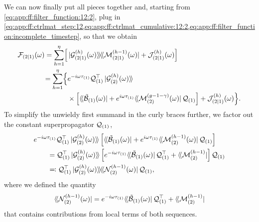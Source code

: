 We can now finally put all pieces together and, starting from \cref{eq:app:ff:filter_function:12:2}, plug in \cref{eq:app:ff:ctrlmat_step:12,eq:app:ff:ctrlmat_cumulative:12:2,eq:app:ff:filter_function:incomplete_timestep}, so that we obtain
\begin{align}
    \FF_{(2|1)}(\omega) = \sum_{h=1}^{\eta}\Bigl[ & \dop*{\mc{G}_{(2|1)}\gth{h}(\omega)}{\mc{M}_{(2|1)}\gth{h-1}(\omega)}
                                                    + \mc{J}_{(2|1)}\gth{h}(\omega)\Bigr] \notag \\
                        = \sum_{h=1}^{\eta}\Bigl\lbrace
                               & \e^{-\i\omega\tau_{(1)}}\liouvQ_{(1)}\transpose\dket*{\mc{G}_{(2)}\gth{h}(\omega)} \\
                               & \times\Bigl[
                                     \dbra*{\ctrlmat_{(1)}(\omega)} + \e^{\i\omega\tau_{(1)}}\dbra*{\mc{M}_{(2)}\gth{g-1-\gamma}(\omega)}\liouvQ_{(1)}
                                 \Bigr] +\mc{J}_{(2|1)}\gth{h}(\omega)
                        \Bigr\rbrace. \notag
\end{align}
To simplify the unwieldy first summand in the curly braces further, we factor out the constant superpropagator $\mathcal{Q}_{(1)}$,
\begin{align}
    \MoveEqLeft \e^{-\i\omega\tau_{(1)}}\liouvQ_{(1)}\transpose\dket*{\mc{G}_{(2)}\gth{h}(\omega)}\left[\dbra*{\ctrlmat_{(1)}(\omega)}
            + \e^{\i\omega\tau_{(1)}}\dbra*{\mc{M}_{(2)}\gth{h-1}(\omega)}\liouvQ_{(1)}\right] \notag \\
        &= \liouvQ_{(1)}\transpose\dket*{\mc{G}_{(2)}\gth{h}(\omega)}\left[
               \e^{-\i\omega\tau_{(1)}}\dbra*{\ctrlmat_{(1)}(\omega)}\liouvQ_{(1)}\transpose + \dbra*{\mc{M}_{(2)}\gth{h-1}}
           \right]\liouvQ_{(1)} \\
        &\eqqcolon \liouvQ_{(1)}\transpose\dop*{\mc{G}_{(2)}\gth{h}(\omega)}{\mc{N}_{(2)}\gth{h-1}(\omega)}\liouvQ_{(1)},
\end{align}
where we defined the quantity
\begin{equation}
    \dbra*{\mc{N}_{(2)}\gth{h-1}(\omega)} = \e^{-\i\omega\tau_{(1)}}\dbra*{\ctrlmat_{(1)}(\omega)}\liouvQ_{(1)}\transpose + \dbra*{\mc{M}_{(2)}\gth{h-1}}
\end{equation}
that contains contributions from local terms of both sequences.
